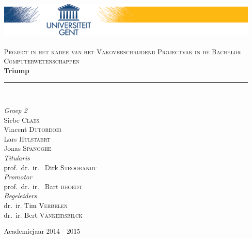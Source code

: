 \documentclass[a4paper,11.5pt]{report}
\newcommand{\HRule}{\rule{\linewidth}{0.5mm}}
\begin{document}



\begin{titlepage}
\begin{center}

\includegraphics[width=\linewidth]{ugent}~\\[2.5cm]

\textsc{Project in het kader van het Vakoverschrijdend Projectvak in de Bachelor Computerwetenschappen}\\[1.5cm]




{ \huge \bfseries Triump \\[0.4cm] }

\HRule \\[1.5cm]

\begin{minipage}{0.5\textwidth}
\begin{center} \large
\emph{Groep 2}\\
Siebe \textsc{Claes}\\
Vincent \textsc{Dutordoir}\\
Lars \textsc{Hulstaert}\\
Jonas \textsc{Spanoghe}\\[2.5cm]
\emph{Titularis}\\
prof.~dr.~ir.~ Dirk \textsc{Stroobandt}\\[0.2cm]
\emph{Promotor}\\
prof.~dr.~ir.~ Bart \textsc{dhoedt}\\[0.2cm]
\emph{Begeleiders}\\
dr.~ir. Tim \textsc{Verbelen}\\
dr.~ir. Bert \textsc{Vankeirsbilck}\\
\end{center}
\end{minipage}

\vfill

{\large Academiejaar 2014 - 2015}

\end{center}
\end{titlepage}

\tableofcontents












\end{document}
